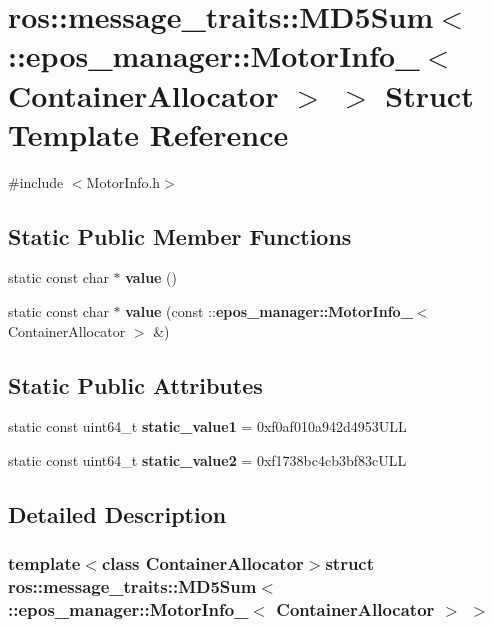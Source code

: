 \section{ros\-:\-:message\-\_\-traits\-:\-:\-M\-D5\-Sum$<$ \-:\-:epos\-\_\-manager\-:\-:\-Motor\-Info\-\_\-$<$ \-Container\-Allocator $>$ $>$ \-Struct \-Template \-Reference}
\label{structros_1_1message__traits_1_1MD5Sum_3_01_1_1epos__manager_1_1MotorInfo___3_01ContainerAllocator_01_4_01_4}


{\ttfamily \#include $<$\-Motor\-Info.\-h$>$}

\subsection*{\-Static \-Public \-Member \-Functions}
\begin{DoxyCompactItemize}
\item 
static const char $\ast$ {\bf value} ()
\item 
static const char $\ast$ {\bf value} (const \-::{\bf epos\-\_\-manager\-::\-Motor\-Info\-\_\-}$<$ \-Container\-Allocator $>$ \&)
\end{DoxyCompactItemize}
\subsection*{\-Static \-Public \-Attributes}
\begin{DoxyCompactItemize}
\item 
static const uint64\-\_\-t {\bf static\-\_\-value1} = 0xf0af010a942d4953\-U\-L\-L
\item 
static const uint64\-\_\-t {\bf static\-\_\-value2} = 0xf1738bc4cb3bf83c\-U\-L\-L
\end{DoxyCompactItemize}


\subsection{\-Detailed \-Description}
\subsubsection*{template$<$class Container\-Allocator$>$struct ros\-::message\-\_\-traits\-::\-M\-D5\-Sum$<$ \-::epos\-\_\-manager\-::\-Motor\-Info\-\_\-$<$ Container\-Allocator $>$ $>$}




